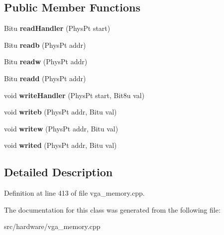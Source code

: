 \subsection*{Public Member Functions}
\begin{DoxyCompactItemize}
\item 
\hypertarget{classVGA__UnchainedVGA__Handler_a5de9a4081506d1b355ee928fa4e31201}{Bitu {\bfseries read\-Handler} (Phys\-Pt start)}\label{classVGA__UnchainedVGA__Handler_a5de9a4081506d1b355ee928fa4e31201}

\item 
\hypertarget{classVGA__UnchainedVGA__Handler_a1b0dc799e980e96f118df760279842ff}{Bitu {\bfseries readb} (Phys\-Pt addr)}\label{classVGA__UnchainedVGA__Handler_a1b0dc799e980e96f118df760279842ff}

\item 
\hypertarget{classVGA__UnchainedVGA__Handler_af4b4ff984ede83769e0b935164b1c682}{Bitu {\bfseries readw} (Phys\-Pt addr)}\label{classVGA__UnchainedVGA__Handler_af4b4ff984ede83769e0b935164b1c682}

\item 
\hypertarget{classVGA__UnchainedVGA__Handler_a6192137facf30fdbdf1a967c540c9431}{Bitu {\bfseries readd} (Phys\-Pt addr)}\label{classVGA__UnchainedVGA__Handler_a6192137facf30fdbdf1a967c540c9431}

\item 
\hypertarget{classVGA__UnchainedVGA__Handler_a2ff44c0c054b1aa0697374ae2fca666a}{void {\bfseries write\-Handler} (Phys\-Pt start, Bit8u val)}\label{classVGA__UnchainedVGA__Handler_a2ff44c0c054b1aa0697374ae2fca666a}

\item 
\hypertarget{classVGA__UnchainedVGA__Handler_a5c1bc86d9e0874e6b738440ab1a46cab}{void {\bfseries writeb} (Phys\-Pt addr, Bitu val)}\label{classVGA__UnchainedVGA__Handler_a5c1bc86d9e0874e6b738440ab1a46cab}

\item 
\hypertarget{classVGA__UnchainedVGA__Handler_a52dbbef8deba1e3f29ec5ff924742dff}{void {\bfseries writew} (Phys\-Pt addr, Bitu val)}\label{classVGA__UnchainedVGA__Handler_a52dbbef8deba1e3f29ec5ff924742dff}

\item 
\hypertarget{classVGA__UnchainedVGA__Handler_aad4069e3c9c64274ae4ccd03851b2ca6}{void {\bfseries writed} (Phys\-Pt addr, Bitu val)}\label{classVGA__UnchainedVGA__Handler_aad4069e3c9c64274ae4ccd03851b2ca6}

\end{DoxyCompactItemize}


\subsection{Detailed Description}


Definition at line 413 of file vga\-\_\-memory.\-cpp.



The documentation for this class was generated from the following file\-:\begin{DoxyCompactItemize}
\item 
src/hardware/vga\-\_\-memory.\-cpp\end{DoxyCompactItemize}
